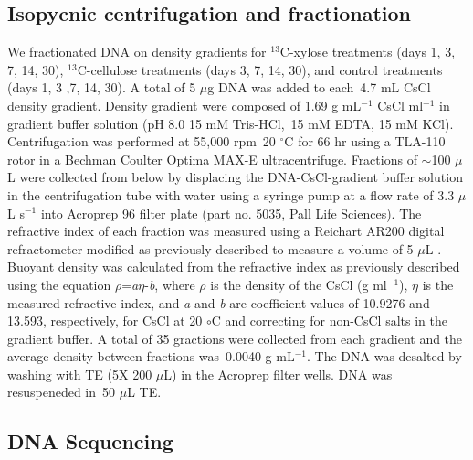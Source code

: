\documentclass{article}
\begin{document}
\subsection{Isopycnic centrifugation and fractionation} 
We fractionated DNA on density gradients for $^{13}$C-xylose treatments (days
1, 3, 7, 14, 30), $^{13}$C-cellulose treatments (days 3, 7, 14, 30), and
control treatments (days 1, 3 ,7, 14, 30). A total of 5 $\mu$g DNA was added to
each~4.7 mL CsCl density gradient.  Density gradient were composed of 1.69
g mL$^{-1}$ CsCl ml$^{-1}$ in gradient buffer solution (pH 8.0 15 mM
Tris-HCl,~15 mM EDTA, 15 mM KCl). Centrifugation was performed at 55,000 rpm~20
$^{\circ}$C for 66 hr using a TLA-110 rotor in a Bechman Coulter Optima MAX-E
ultracentrifuge. Fractions of $\sim$100 $\mu$L were collected from below by
displacing the DNA-CsCl-gradient buffer solution in the centrifugation tube
with water using a syringe pump at a flow rate of 3.3 $\mu$L s$^{-1}$
\citep{Manefield_2002} into Acroprep 96 filter plate (part no. 5035, Pall Life
Sciences). The refractive index of each fraction was measured using a Reichart
AR200 digital refractometer modified as previously described to measure
a volume of 5 $\mu$L \citep{Buckley_2007}. Buoyant density was calculated from
the refractive index as previously described \citep{Buckley_2007} using the
equation $\rho$=\textit{a}$\eta$-\textit{b}, where $\rho$ is the density of the
CsCl (g ml$^{-1}$), $\eta$ is the measured refractive index, and \textit{a} and
\textit{b} are coefficient values of 10.9276 and 13.593, respectively, for CsCl
at 20 ${\circ}$C \citep{9780408708036} and correcting for non-CsCl salts in
the gradient buffer. A total of 35 gractions were collected from each gradient
and the average density between fractions was~0.0040 g mL$^{-1}$. The DNA was
desalted by washing with TE (5X 200 $\mu$L) in the Acroprep filter wells. DNA
was resuspeneded in~50 $\mu$L TE. 

\subsection{DNA Sequencing}
\end{document}
